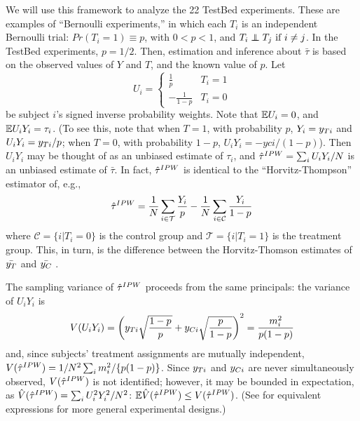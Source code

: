 We will use this framework to analyze the 22 TestBed experiments.
These are examples of ``Bernoulli experiments,'' in
which each $T_i$ is an
independent Bernoulli trial: $Pr(T_i=1)\equiv p$, with $0<p<1$, and
$T_i\independent T_j \text{ if } i\ne j$.
In the TestBed experiments,
$p=1/2$.
Then, estimation and inference about $\bar{\tau}$ is based on
the observed values of $Y$ and $T$, and the known value of $p$.
Let
\begin{equation*}
U_i=\begin{cases}
\frac{1}{p} & T_i=1\\
-\frac{1}{1-p} & T_i=0
\end{cases}
\end{equation*}
be subject $i$'s signed inverse probability weights.
Note that $\mathbb{E} U_i=0$, and $\mathbb{E} U_iY_i=\tau_i$.
(To see this, note that when $T=1$, with probability $p$,
$Y_i=y_{Ti}$ and $U_iY_i=y_{Ti}/p$; when $T=0$, with probability
$1-p$, $U_iY_i=-yci/(1-p)$).
Then $U_iY_i$ may be thought of as an unbiased estimate of $\tau_i$, and $\hat{\tau}^{IPW}=\sum_iU_iY_i/N$ is an unbiased estimate
of $\bar{\tau}$.
In fact, $\hat{\tau}^{IPW}$ is identical to the ``Horvitz-Thompson'' estimator
of, e.g., \citet{aronowMiddleton}
\begin{equation*}
\hat{\tau}^{IPW}=\frac{1}{N}\displaystyle\sum_{i\in\mathcal{T}}
\frac{Y_i}{p}-\frac{1}{N}\displaystyle\sum_{i\in\mathcal{C}}\frac{Y_i}{1-p}
\end{equation*}
where $\mathcal{C} = \{i | T_i = 0\}$ is the control group and
$\mathcal{T} = \{i | T_i = 1\}$ is the treatment group.
This, in turn, is the difference between the Horvitz-Thomson
estimates of $\bar{y_T}$ and $\bar{y_C}$ \citep{horvitzThompson}.

\sloppy
The sampling variance of $\hat{\tau}^{IPW}$ proceeds from the same principals:
the variance of $U_iY_i$ is
\begin{equation}\label{eq:varTauHat1}
V(U_iY_i)=\left(y_{Ti}\sqrt{\frac{1-p}{p}}+y_{Ci}\sqrt{\frac{p}{1-p}}\right)^2=\frac{m_i^2}{p(1-p)}
\end{equation}
and, since  subjects' treatment assignments are mutually independent,
$V(\hat{\tau}^{IPW})=1/N^2\sum_im_i^2/\{p(1-p)\}$.
Since $y_{Ti} $ and $y_{Ci} $ are never simultaneously observed,
$V(\hat{\tau}^{IPW})$ is not identified; however, it may be bounded in expectation,
as $\hat{V}(\hat{\tau}^{IPW})=\sum_iU_i^2Y_i^2/N^2$:
$\mathbb{E}\hat{V}(\hat{\tau}^{IPW})\le V(\hat{\tau}^{IPW})$.
(See \citealt{aronowMiddleton} for equivalent expressions for more
general experimental designs.)

